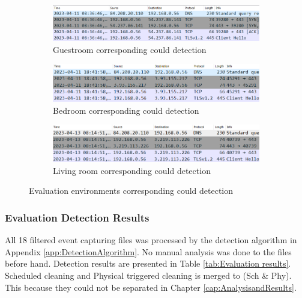 \begin{figure}[H]
    \centering
    
    \begin{subfigure}{0.80\textwidth}
        \centering
        \includegraphics[width=\linewidth]{figures/Evaluation_cloud_detection1.png}
        \caption{Guestroom corresponding could detection}
        \label{fig:Evaluation_coulddetection_1}
    \end{subfigure}
    \hfill
    \begin{subfigure}{0.80\textwidth}
        \centering
        \includegraphics[width=\linewidth]{figures/Evaluation_cloud_detection2.png}
        \caption{Bedroom corresponding could detection}
        \label{fig:Evaluation_clouddetection_2}
    \end{subfigure}
    \hfill
    \begin{subfigure}{0.80\textwidth}
        \centering
        \includegraphics[width=\linewidth]{figures/Evaluation_cloud_detection3.png}
        \caption{Living room corresponding could detection}
        \label{fig:Evaluation_clouddetection_3}
    \end{subfigure}
    
    \caption{Evaluation environments corresponding could detection}
    \label{fig:evaluation_corresponding_cloud}
\end{figure}

\subsubsection{Evaluation Detection Results}
All 18 filtered event capturing files was processed by the detection algorithm in Appendix \ref{app:DetectionAlgorithm}. No manual analysis was done to the files before hand. Detection results are presented in Table \ref{tab:Evaluation results}. Scheduled cleaning and Physical triggered cleaning is merged to (Sch \& Phy). This because they could not be separated in Chapter \ref{cap:AnalysisandResults}.

